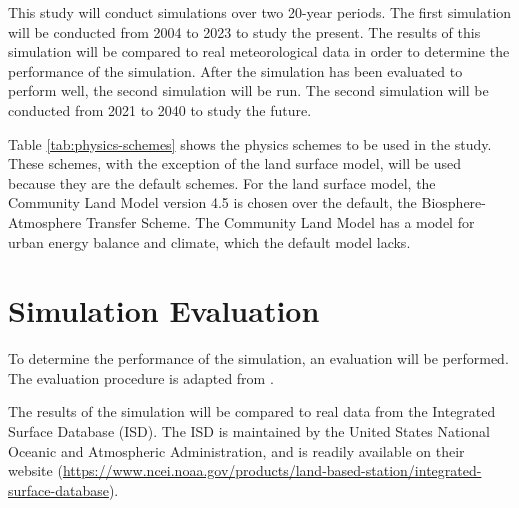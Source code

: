 	This study will conduct simulations over two 20-year periods.
	The first simulation will be conducted from 2004 to 2023 to study the present.
	The results of this simulation will be compared to real meteorological data in order to determine the performance of the simulation.
	After the simulation has been evaluated to perform well, the second simulation will be run.
	The second simulation will be conducted from 2021 to 2040 to study the future.
	
	Table \ref{tab:physics-schemes} shows the physics schemes to be used in the study.
	These schemes, with the exception of the land surface model, will be used because they are the default schemes. 
	For the land surface model, the Community Land Model version 4.5 is chosen over the default, the Biosphere-Atmosphere Transfer Scheme. 
	The Community Land Model has a model for urban energy balance and climate, which the default model lacks.
	
\section{Simulation Evaluation}
	To determine the performance of the simulation, an evaluation will be performed. The evaluation procedure is adapted from \textcite{Bilang2022}.
	
	The results of the simulation will be compared to real data from the Integrated Surface Database (ISD).
	The ISD is maintained by the United States National Oceanic and Atmospheric Administration, and is readily available on their website 
		(\url{https://www.ncei.noaa.gov/products/land-based-station/integrated-surface-database}).
	
